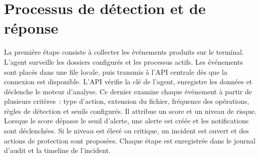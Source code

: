 \section{Processus de détection et de réponse}

La première étape consiste à collecter les événements produits sur le terminal. L'agent surveille les dossiers configurés et les processus actifs. Les événements sont placés dans une file locale, puis transmis à l'API centrale dès que la connexion est disponible. L'API vérifie la clé de l'agent, enregistre les données et déclenche le moteur d'analyse. Ce dernier examine chaque événement à partir de plusieurs critères~: type d'action, extension du fichier, fréquence des opérations, règles de détection et seuils configurés. Il attribue un score et un niveau de risque. Lorsque le score dépasse le seuil d'alerte, une alerte est créée et les notifications sont déclenchées. Si le niveau est élevé ou critique, un incident est ouvert et des actions de protection sont proposées. Chaque étape est enregistrée dans le journal d'audit et la timeline de l'incident.

